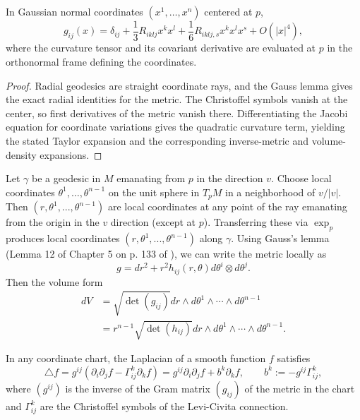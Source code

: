 \begin{lemma}
\label{lem:normal-coordinates-expansion}


In Gaussian normal coordinates $(x^1,\ldots,x^n)$ centered at $p$,
$$g_{ij}(x)=\delta_{ij}+\frac13R_{iklj}x^kx^l
+\frac16R_{iklj,s}x^kx^lx^s+O(|x|^4),$$
where the curvature tensor and its covariant derivative are
evaluated at $p$ in the orthonormal frame defining the coordinates.
\end{lemma}

\begin{proof}
\sketch
{}
Radial geodesics are straight coordinate rays, and the Gauss lemma gives the exact radial identities for the metric. The Christoffel symbols vanish at the center, so first derivatives of the metric vanish there. Differentiating the Jacobi equation for coordinate variations gives the quadratic curvature term, yielding the stated Taylor expansion and the corresponding inverse-metric and volume-density expansions.
\end{proof}

Let $\gamma$ be a geodesic in $M$ emanating from $p$ in the direction $v$.
Choose local coordinates $\theta^1,\ldots,\theta^{n-1}$ on the unit sphere in
$T_pM$ in a neighborhood of $v/|v|$. Then $(r, \theta^{1}, ... ,\theta^{n-1})$
are local coordinates at any point of the ray emanating from the origin in the
$v$ direction (except at $p$). Transferring these via $\exp_p$ produces
local coordinates $(r,\theta^{1}, ... ,\theta^{n-1})$ along $\gamma$. Using
Gauss's lemma (Lemma 12 of Chapter 5 on p. 133 of \cite{Petersen}), we can
write the metric locally as
\[ g=dr^{2}+
r^{2}h_{ij}(r,\theta)d\theta^{i}\otimes d\theta^{j}. \] Then the
volume form
\begin{align*}
dV &= \sqrt{\det(g_{ij})}dr\wedge d\theta^{1}
\wedge\cdots\wedge
d\theta^{n-1}\\
& = r^{n-1}\sqrt{\det(h_{ij})}dr\wedge d\theta^{1}
\wedge\cdots\wedge d\theta^{n-1}.
\end{align*}



\begin{lemma}
\label{lem:laplacian-christoffel-formula}





In any coordinate chart, the Laplacian of a smooth function $f$
satisfies
\[ \triangle f
   = g^{ij}\left(\partial_i\partial_jf-\Gamma^k_{ij}\partial_kf\right)
   = g^{ij}\partial_i\partial_jf+b^k\partial_kf,
   \qquad b^k:=-g^{ij}\Gamma^k_{ij}, \]
where $(g^{ij})$ is the inverse of the Gram matrix $(g_{ij})$ of the
metric in the chart and $\Gamma^k_{ij}$ are the Christoffel symbols of
the Levi-Civita connection.
\end{lemma}

